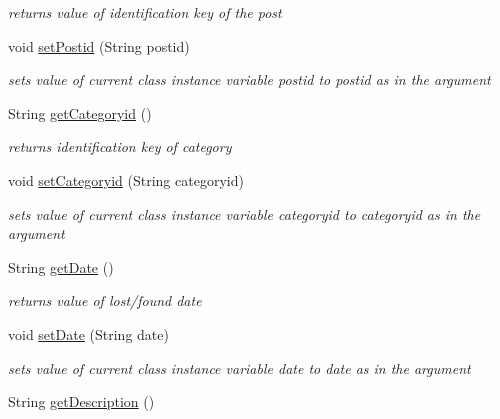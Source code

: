 \begin{DoxyCompactItemize}
\begin{DoxyCompactList}\small\item\em returns value of identification key of the post \end{DoxyCompactList}\item 
void \hyperlink{classcom_1_1example_1_1sel_1_1lostfound_1_1Posts_a75c83d60e892880de5b3e22224374739}{set\+Postid} (String postid)
\begin{DoxyCompactList}\small\item\em sets value of current class instance variable postid to postid as in the argument \end{DoxyCompactList}\item 
String \hyperlink{classcom_1_1example_1_1sel_1_1lostfound_1_1Posts_a16378dcdf5752029dd2b347640e08ad6}{get\+Categoryid} ()\hypertarget{classcom_1_1example_1_1sel_1_1lostfound_1_1Posts_a16378dcdf5752029dd2b347640e08ad6}{}\label{classcom_1_1example_1_1sel_1_1lostfound_1_1Posts_a16378dcdf5752029dd2b347640e08ad6}

\begin{DoxyCompactList}\small\item\em returns identification key of category \end{DoxyCompactList}\item 
void \hyperlink{classcom_1_1example_1_1sel_1_1lostfound_1_1Posts_acddafa54e3c47731c23140baa44cc5f7}{set\+Categoryid} (String categoryid)
\begin{DoxyCompactList}\small\item\em sets value of current class instance variable categoryid to categoryid as in the argument \end{DoxyCompactList}\item 
String \hyperlink{classcom_1_1example_1_1sel_1_1lostfound_1_1Posts_a48289c70fa035673575e948b60fef456}{get\+Date} ()\hypertarget{classcom_1_1example_1_1sel_1_1lostfound_1_1Posts_a48289c70fa035673575e948b60fef456}{}\label{classcom_1_1example_1_1sel_1_1lostfound_1_1Posts_a48289c70fa035673575e948b60fef456}

\begin{DoxyCompactList}\small\item\em returns value of lost/found date \end{DoxyCompactList}\item 
void \hyperlink{classcom_1_1example_1_1sel_1_1lostfound_1_1Posts_af6064c421253492306e1eb896e190612}{set\+Date} (String date)
\begin{DoxyCompactList}\small\item\em sets value of current class instance variable date to date as in the argument \end{DoxyCompactList}\item 
String \hyperlink{classcom_1_1example_1_1sel_1_1lostfound_1_1Posts_a29b12fbb98f54b0b154df4e671c0e322}{get\+Description} ()\hypertarget{classcom_1_1example_1_1sel_1_1lostfound_1_1Posts_a29b12fbb98f54b0b154df4e671c0e322}{}\label{classcom_1_1example_1_1sel_1_1lostfound_1_1Posts_a29b12fbb98f54b0b154df4e671c0e322}


\end{DoxyCompactItemize}
